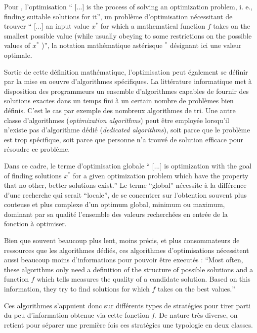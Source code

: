 Pour \textcite[22]{Weise2011}, l'optimisation \foreignquote{english}{ [...] is the process of solving an optimization problem, i. e., finding suitable solutions for it}, un problème d'optimisation nécessitant de trouver \foreignquote{english}{ [...] an input value $x^*$ for which a mathematical function $f$ takes on the smallest possible value (while usually obeying to some restrictions on the possible values of $x^*$ )}, la notation mathématique astérisque $^*$ désignant ici une valeur optimale.

Sortie de cette définition mathématique, l'optimisation peut également se définir par la mise en oeuvre d'algorithmes spécifiques. La littérature informatique met à disposition des programmeurs un ensemble d'algorithmes capables de fournir des solutions exactes dans un temps fini à un certain nombre de problèmes bien définis. C'est le cas par exemple des nombreux algorithmes de tri. Une autre classe d'algorithmes (\textit{optimization algorithms}) peut être employée lorsqu'il n'existe pas d'algorithme dédié (\textit{dedicated algorithms}), soit parce que le problème est trop spécifique, soit parce que personne n'a trouvé de solution efficace pour résoudre ce problème.

Dans ce cadre, le terme d'optimisation globale \foreignquote{english}{ [...] is optimization with the goal of finding solutions $x^*$ for a given optimization problem which have the property that no other, better solutions exist.} Le terme \enquote{global} nécessite à la différence d'une recherche qui serait \enquote{locale}, de se concentrer sur l'obtention souvent plus couteuse et plus complexe d'un optimum global, minimum ou maximum, dominant par sa qualité l'ensemble des valeurs recherchées en entrée de la fonction à optimiser.

Bien que souvent beaucoup plus lent, moins précis, et plus consommateurs de ressources que les algorithmes dédiés, ces algorithmes d'optimisations nécessitent aussi beaucoup moins d'informations pour pouvoir être executés : \foreignquote{english}{Most often, these algorithms only need a definition of the structure of possible solutions and a function $f$ which tells measures the quality of a candidate solution. Based on this information, they try to find solutions for which $f$ takes on the best values.} \autocite[24]{Weise2011}

Ces algorithmes s'appuient donc sur différents types de stratégies pour tirer parti du peu d'information obtenue via cette fonction $f$. De nature très diverse, on retient pour séparer une première fois ces stratégies une typologie en deux classes.

